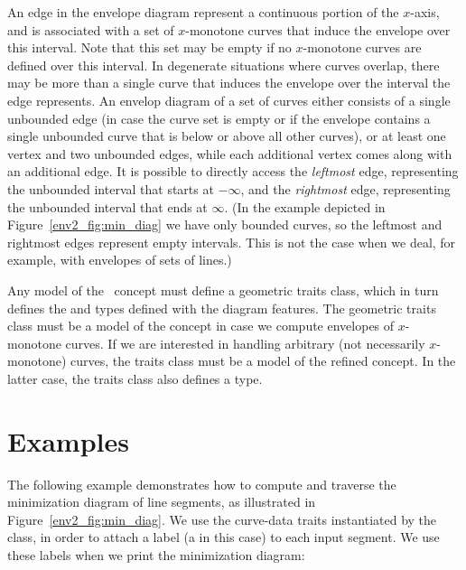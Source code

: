 An edge in the envelope diagram represent a continuous portion of the
$x$-axis, and is associated with a set of $x$-monotone curves that
induce the envelope over this interval. Note that this set may be
empty if no $x$-monotone curves are defined over this interval. In
degenerate situations where curves overlap, there may be more than
a single curve that induces the envelope over the interval the edge
represents. An envelop diagram of a set of curves either consists of
a single unbounded edge (in case the curve set is empty or if the
envelope contains a single unbounded curve that is below or above
all other curves), or at least one vertex and two unbounded edges,
while each additional vertex comes along with an additional edge. It
is possible to directly access the {\em leftmost} edge, representing
the unbounded interval that starts at $-\infty$, and the {\em rightmost}
edge, representing the unbounded interval that ends at $\infty$.
(In the example depicted in Figure~\ref{env2_fig:min_diag} we have
only bounded curves, so the leftmost and rightmost edges represent
empty intervals. This is not the case when we deal, for example, with
envelopes of sets of lines.)

Any model of the \ccRefName\ concept must define a geometric
traits class, which in turn defines the  and 
 types defined with the diagram features.
The geometric traits class must be a model of the 
 concept in case we compute
envelopes of $x$-monotone curves. If we are interested in handling
arbitrary (not necessarily $x$-monotone) curves, the traits class
must be a model of the refined  concept.
In the latter case, the traits class also defines a 
type.

\section{Examples}

The following example demonstrates how to compute and traverse the
minimization diagram of line segments, as illustrated in
Figure~\ref{env2_fig:min_diag}. We use the curve-data traits
instantiated by the  class, in order to
attach a label (a  in this case) to each input segment.
We use these labels when we print the minimization diagram:


